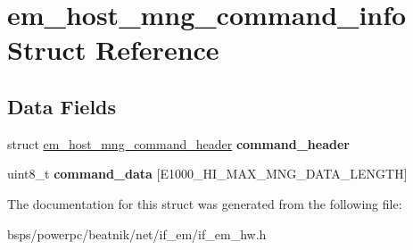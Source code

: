 \hypertarget{structem__host__mng__command__info}{}\section{em\+\_\+host\+\_\+mng\+\_\+command\+\_\+info Struct Reference}
\label{structem__host__mng__command__info}
\subsection*{Data Fields}
\begin{DoxyCompactItemize}
\item 
\mbox{\label{structem__host__mng__command__info_af5d0aee685395b2ee5d83e017c7ac5c3}} 
struct \mbox{\hyperlink{structem__host__mng__command__header}{em\+\_\+host\+\_\+mng\+\_\+command\+\_\+header}} {\bfseries command\+\_\+header}
\item 
\mbox{\label{structem__host__mng__command__info_a1a27870508e710d97a8391759373946d}} 
uint8\+\_\+t {\bfseries command\+\_\+data} \mbox{[}E1000\+\_\+\+H\+I\+\_\+\+M\+A\+X\+\_\+\+M\+N\+G\+\_\+\+D\+A\+T\+A\+\_\+\+L\+E\+N\+G\+TH\mbox{]}
\end{DoxyCompactItemize}


The documentation for this struct was generated from the following file\+:\begin{DoxyCompactItemize}
\item 
bsps/powerpc/beatnik/net/if\+\_\+em/if\+\_\+em\+\_\+hw.\+h\end{DoxyCompactItemize}

